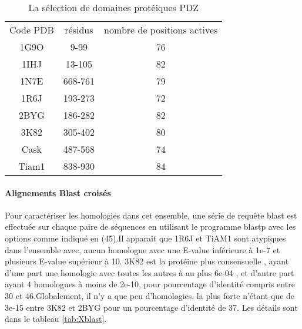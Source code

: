     \begin{table}[!htbp]
      \centering

      \begin{tabular}{ccc}

        \toprule
        Code PDB & résidus & nombre de positions actives\\
        \cmidrule{1-3}
        1G9O  & 	9-99	 & 	76	 \\
        1IHJ  & 	13-105	 & 	82	 \\
        1N7E  & 	668-761	 & 	79	 \\
        1R6J  & 	193-273	 & 	72	 \\
        2BYG  & 	186-282	 & 	82	 \\
        3K82  & 	305-402	 & 	80	 \\
        Cask  & 	487-568	 & 	74	 \\
        Tiam1 & 	838-930	 & 	84	 \\
        \bottomrule

      \end{tabular}      
      \caption{La sélection de domaines protéiques PDZ}
\label{tab:protéines_PDZ}      
    \end{table}




\paragraph{Alignements Blast croisés}
Pour caractériser les homologies dans cet ensemble, une série de requête blast est effectuée sur chaque paire de séquences en utilisant le programme blastp avec les options comme indiqué en (45).Il apparaît que 1R6J et TiAM1 sont atypiques dans l'ensemble avec, aucun homologue avec une E-value inférieure à 1e-7 et plusieurs E-value supérieur à 10. 3K82 est la protéine plus consensuelle , ayant d'une part une homologie avec toutes les autres à au plus 6e-04 , et d'autre part ayant 4 homologues à moins de 2e-10, pour pourcentage d'identité compris entre 30 et 46.Globalement, il n'y a que peu d'homologies, la plus forte n'étant que de 3e-15 entre 3K82 et 2BYG pour un pourcentage d'identité de 37. Les détails sont dans le tableau \ref{tab:Xblast}.


